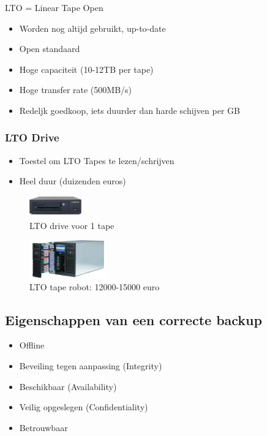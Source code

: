 \documentclass{article}
\begin{document}
LTO = Linear Tape Open

\begin{itemize}
    \item Worden nog altijd gebruikt, up-to-date
    \item Open standaard
    \item Hoge capaciteit (10-12TB per tape)
    \item Hoge transfer rate (500MB/s)
    \item Redeljk goedkoop, iets duurder dan harde schijven per GB
\end{itemize}

\subsubsection{LTO Drive}


\begin{itemize}
    \item Toestel om LTO Tapes te lezen/schrijven
    \item Heel duur (duizenden euros)
\end{itemize}

\begin{figure}[H]
    \centering
    \includegraphics[width=0.2\textwidth]{lto-drive-single.png}
    \caption{LTO drive voor 1 tape}
\end{figure}

\begin{figure}[H]
    \centering
    \includegraphics[width=0.3\textwidth]{lto-drive-multi.png}
    \caption{LTO tape robot: 12000-15000 euro}
\end{figure}


\subsection{Eigenschappen van een correcte backup}

\begin{itemize}
    \item Offline
    \item Beveiling tegen aanpassing (Integrity)
    \item Beschikbaar (Availability)
    \item Veilig opgeslegen (Confidentiality)
    \item Betrouwbaar 
\end{itemize}
\end{document}
